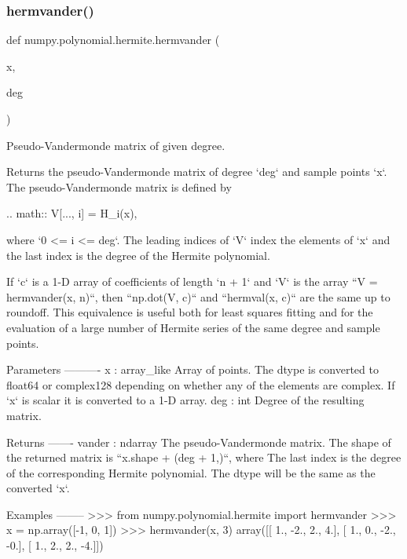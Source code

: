 \subsubsection{\texorpdfstring{hermvander()}{hermvander()}}
{\footnotesize\ttfamily def numpy.\+polynomial.\+hermite.\+hermvander (\begin{DoxyParamCaption}\item[{}]{x,  }\item[{}]{deg }\end{DoxyParamCaption})}

\begin{DoxyVerb}Pseudo-Vandermonde matrix of given degree.

Returns the pseudo-Vandermonde matrix of degree `deg` and sample points
`x`. The pseudo-Vandermonde matrix is defined by

.. math:: V[..., i] = H_i(x),

where `0 <= i <= deg`. The leading indices of `V` index the elements of
`x` and the last index is the degree of the Hermite polynomial.

If `c` is a 1-D array of coefficients of length `n + 1` and `V` is the
array ``V = hermvander(x, n)``, then ``np.dot(V, c)`` and
``hermval(x, c)`` are the same up to roundoff. This equivalence is
useful both for least squares fitting and for the evaluation of a large
number of Hermite series of the same degree and sample points.

Parameters
----------
x : array_like
    Array of points. The dtype is converted to float64 or complex128
    depending on whether any of the elements are complex. If `x` is
    scalar it is converted to a 1-D array.
deg : int
    Degree of the resulting matrix.

Returns
-------
vander : ndarray
    The pseudo-Vandermonde matrix. The shape of the returned matrix is
    ``x.shape + (deg + 1,)``, where The last index is the degree of the
    corresponding Hermite polynomial.  The dtype will be the same as
    the converted `x`.

Examples
--------
>>> from numpy.polynomial.hermite import hermvander
>>> x = np.array([-1, 0, 1])
>>> hermvander(x, 3)
array([[ 1., -2.,  2.,  4.],
       [ 1.,  0., -2., -0.],
       [ 1.,  2.,  2., -4.]])\end{DoxyVerb}
 \mbox{\label{namespacenumpy_1_1polynomial_1_1hermite_acbdc892710386fc723e25c5b3459919d}} 
